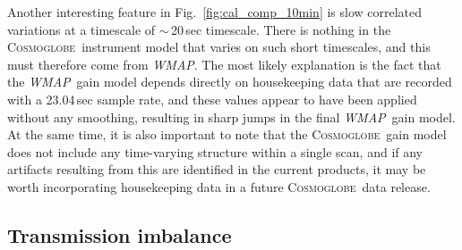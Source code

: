 \documentclass[twocolumn]{../../common/aa}
\def\WMAP{\emph{WMAP}}
\newcommand{\cosmoglobe}{\textsc{Cosmoglobe}}
\begin{document}
Another interesting feature in Fig.~\ref{fig:cal_comp_10min} is slow correlated variations at a timescale of $\sim$\,20\,sec timescale. There is nothing in the \cosmoglobe\ instrument model that varies on such short timescales, and this must therefore come from \WMAP. The most likely explanation is the fact that the \WMAP\ gain model depends directly on housekeeping data that are recorded with a 23.04\,sec sample rate, and these values appear to have been applied without any smoothing, resulting in sharp jumps in the final \WMAP\ gain model. At the same time, it is also important to note that the \cosmoglobe\ gain model does not include any time-varying structure within a single scan, and if any artifacts resulting from this are identified in the current products, it may be worth incorporating housekeeping data in a future  \cosmoglobe\ data release.




\subsection{Transmission imbalance}
\label{sec:xim}
\end{document}
